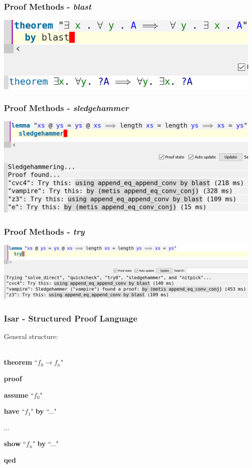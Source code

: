 \documentclass{beamer}
\renewcommand{\indent}{\hspace*{1em}}
\begin{document}
  \begin{frame}
	\frametitle{Proof Methods - \textit{blast}}
	\centering
	\includegraphics[scale=0.7]{images/blast.png}
  \end{frame}

  \begin{frame}
	\frametitle{Proof Methods - \textit{sledgehammer}}
	\centering
	\includegraphics[scale=0.6]{images/sledgehammer.png}
  \end{frame}

  \begin{frame}
	\frametitle{Proof Methods - \textit{try}}
	\centering
	\includegraphics[scale=0.42]{images/try.png}
  \end{frame}

  \begin{frame}
    \frametitle{Isar - Structured Proof Language}
    General structure: \\~\
    
    \textbf{theorem} ``$f_0 \rightarrow f_n$"
    
    \textbf{proof}
    
    \indent \textbf{assume} ``$f_0$"
    
    \indent \textbf{have} ``$f_1$" \textbf{by} ``..."
    
    \indent ...
    
    \indent \textbf{show} ``$f_n$" \textbf{by} ``..."
    
    \textbf{qed}
  \end{frame}
\end{document}
